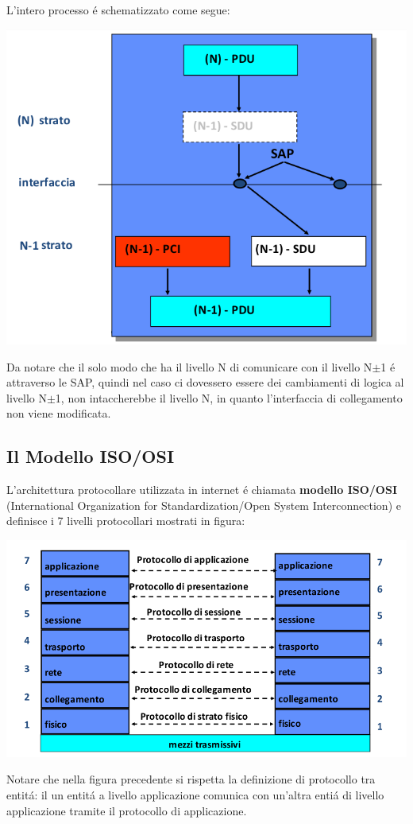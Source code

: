\documentclass[12pt]{article}
\begin{document}
L'intero processo \'e schematizzato come segue:
\begin{center}
	\includegraphics[scale=0.4]{introduzione-img12.png}
\end{center}
Da notare che il solo modo che ha il livello N di comunicare con il livello N$\pm$1 \'e attraverso le SAP, quindi nel caso ci 
dovessero essere dei cambiamenti di logica al livello N$\pm$1, non intaccherebbe il livello N, in quanto l'interfaccia di 
collegamento non viene modificata.

\subsection{Il Modello ISO/OSI}\label{il-modello-iso-osi}
L'architettura protocollare utilizzata in internet \'e chiamata \textbf{modello ISO/OSI} (International Organization for 
Standardization/Open System Interconnection) e definisce i 7 livelli protocollari mostrati in figura:
\begin{center}
	\includegraphics[scale=0.35]{introduzione-img11.png}
\end{center}
Notare che nella figura precedente si rispetta la definizione di protocollo tra entit\'a: il un entit\'a a livello applicazione
comunica con un'altra enti\'a di livello applicazione tramite il protocollo di applicazione.
\end{document}

